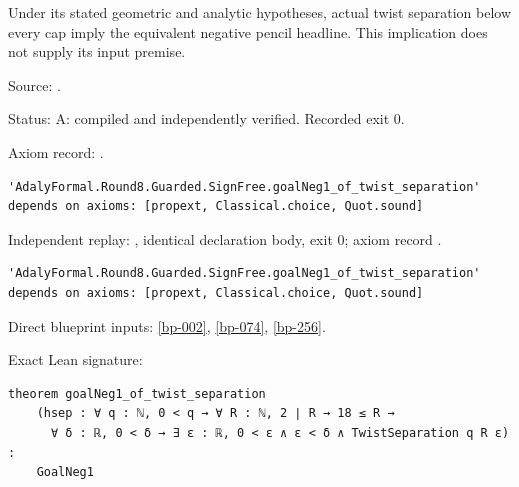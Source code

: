 \begin{theorem}[bp-257]
\label{bp-257}
\leanok
Under its stated geometric and analytic hypotheses, actual twist separation below every cap imply the equivalent negative pencil headline. This implication does not supply its input premise.

\par Source: \texttt{}.
\par Status: A: compiled and independently verified. Recorded exit 0.
\par Axiom record: \texttt{}.
\begin{verbatim}
'AdalyFormal.Round8.Guarded.SignFree.goalNeg1_of_twist_separation' depends on axioms: [propext, Classical.choice, Quot.sound]
\end{verbatim}
\par Independent replay: \texttt{}, identical declaration body, exit 0; axiom record \texttt{}.
\begin{verbatim}
'AdalyFormal.Round8.Guarded.SignFree.goalNeg1_of_twist_separation' depends on axioms: [propext, Classical.choice, Quot.sound]
\end{verbatim}
\par Direct blueprint inputs: \ref{bp-002}, \ref{bp-074}, \ref{bp-256}.
\par Exact Lean signature:
\begin{verbatim}
theorem goalNeg1_of_twist_separation
    (hsep : ∀ q : ℕ, 0 < q → ∀ R : ℕ, 2 ∣ R → 18 ≤ R →
      ∀ δ : ℝ, 0 < δ → ∃ ε : ℝ, 0 < ε ∧ ε < δ ∧ TwistSeparation q R ε) :
    GoalNeg1
\end{verbatim}
\end{theorem}

